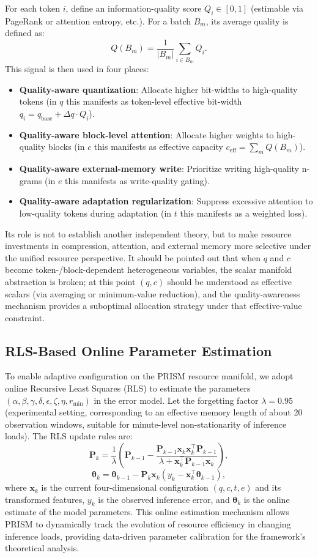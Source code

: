 \documentclass[11pt,a4paper]{article}
\theoremstyle{plain}
\theoremstyle{definition}
\begin{document}
For each token $i$, define an information-quality score $Q_i \in [0,1]$ (estimable via PageRank or attention entropy, etc.). For a batch $B_m$, its average quality is defined as:
\[
Q(B_m) = \frac{1}{|B_m|} \sum_{i \in B_m} Q_i.
\]
This signal is then used in four places:
\begin{itemize}
    \item \textbf{Quality-aware quantization}: Allocate higher bit-widths to high-quality tokens (in $q$ this manifests as token-level effective bit-width $q_i = q_{\text{base}} + \Delta q \cdot Q_i$).
    \item \textbf{Quality-aware block-level attention}: Allocate higher weights to high-quality blocks (in $c$ this manifests as effective capacity $c_{\text{eff}} = \sum_{m} Q(B_m)$).
    \item \textbf{Quality-aware external-memory write}: Prioritize writing high-quality n-grams (in $e$ this manifests as write-quality gating).
    \item \textbf{Quality-aware adaptation regularization}: Suppress excessive attention to low-quality tokens during adaptation (in $t$ this manifests as a weighted loss).
\end{itemize}
Its role is not to establish another independent theory, but to make resource investments in compression, attention, and external memory more selective under the unified resource perspective. It should be pointed out that when $q$ and $c$ become token-/block-dependent heterogeneous variables, the scalar manifold abstraction is broken; at this point $(q,c)$ should be understood as effective scalars (via averaging or minimum-value reduction), and the quality-awareness mechanism provides a suboptimal allocation strategy under that effective-value constraint.

\subsection{RLS-Based Online Parameter Estimation}

To enable adaptive configuration on the PRISM resource manifold, we adopt online Recursive Least Squares (RLS) to estimate the parameters $(\alpha, \beta, \gamma, \delta, \epsilon, \zeta, \eta, r_{\min})$ in the error model. Let the forgetting factor $\lambda = 0.95$ (experimental setting, corresponding to an effective memory length of about 20 observation windows, suitable for minute-level non-stationarity of inference loads). The RLS update rules are:
\[
\mathbf{P}_k = \frac{1}{\lambda}\left(\mathbf{P}_{k-1} - \frac{\mathbf{P}_{k-1} \mathbf{x}_k \mathbf{x}_k^{\top} \mathbf{P}_{k-1}}{\lambda + \mathbf{x}_k^{\top} \mathbf{P}_{k-1} \mathbf{x}_k}\right),
\]
\[
\boldsymbol{\theta}_{k} = \boldsymbol{\theta}_{k-1} - \mathbf{P}_{k}\mathbf{x}_k(y_k - \mathbf{x}_k^{\top}\boldsymbol{\theta}_{k-1}),
\]
where $\mathbf{x}_k$ is the current four-dimensional configuration $(q, c, t, e)$ and its transformed features, $y_k$ is the observed inference error, and $\boldsymbol{\theta}_k$ is the online estimate of the model parameters. This online estimation mechanism allows PRISM to dynamically track the evolution of resource efficiency in changing inference loads, providing data-driven parameter calibration for the framework's theoretical analysis.
\end{document}
